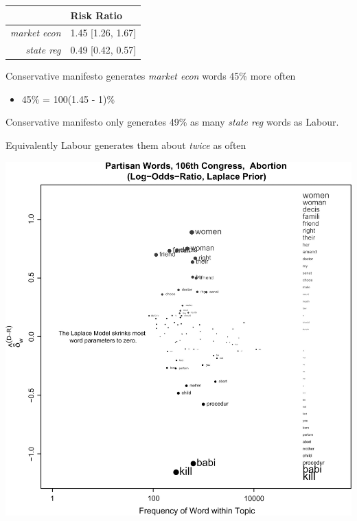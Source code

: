 \documentclass[11pt,compress,professionalfonts]{beamer}
\newcommand{\ita}{\begin{itemize}}
\newcommand{\itm}{\item[]}
\newcommand{\itz}{\end{itemize}}
\begin{document}
\begin{center}
\begin{tabular}{rl} \toprule
 & Risk Ratio\\ \midrule
\textsl{market econ} & 1.45 [1.26, 1.67]\\ 
\textsl{state reg} & 0.49 [0.42, 0.57] \\ \bottomrule
\end{tabular} 
\end{center}

 Conservative manifesto generates \textsl{market econ} words 45\% more often 
\ita
\itm 45\% = 100(1.45 - 1)\% 
\itz
Conservative manifesto only generates 49\% as many \textsl{state reg} words as Labour.  

Equivalently Labour generates them about \textsl{twice} as often


\centerline{\includegraphics[scale=.2]{pictures/fightin1}}





\end{document}

